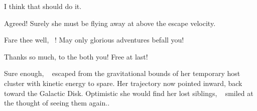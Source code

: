 \documentclass[main.tex]{subfiles}
\begin{document}
\par \Ares I think that should do it.  

\par \Zeus Agreed!  Surely she must be flying away at above the escape velocity.  

\par \Ares Fare thee well, \rmsterope~!  May only glorious adventures befall you!

\par \Sterope Thanks so much, to the both you!  Free at last!

\par \nar Sure enough, \rmsterope~ escaped from the gravitational bounds of her temporary host cluster with kinetic energy to spare.  Her trajectory now pointed inward, back toward the Galactic Disk.  Optimistic she would find her lost siblings, \rmsterope~ smiled at the thought of seeing them again..
\end{document}
